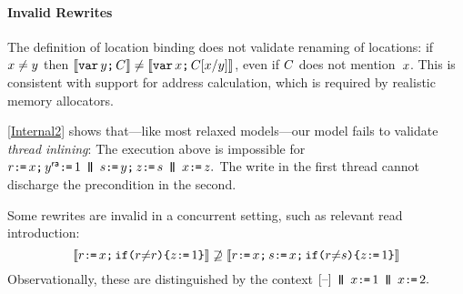 

\paragraph{Invalid Rewrites}

The definition of location binding does not validate renaming of locations:
if $x\neq y$ then
$\llbracket\texttt{var}\,y\texttt{;}\,\allowbreak C\rrbracket\neq\llbracket\texttt{var}\,x\texttt{;}\,\allowbreak C[x/y]\rrbracket$, even
if $C$ does not mention~$x$.  This is consistent with support for
address calculation, which is required by realistic memory allocators.

\ref{Internal2} shows that---like most relaxed models---our model
fails to validate \emph{thread inlining}: The execution above is impossible
for
\begin{math}
  \aReg\GETS x\SEMI
  y\REL\GETS 1\PAR
  \bReg\GETS y\SEMI
  z\GETS \bReg
  \PAR
  x\GETS z.
\end{math}
The write in the first thread cannot discharge the precondition in the
second.


Some rewrites are invalid in a concurrent setting, such as
relevant read introduction:
\begin{displaymath}
  \llbracket r \texttt{:}\mkern-1mu\texttt{=}\, x \texttt{;}\,\allowbreak \texttt{if}\allowbreak\texttt{(}r {\neq} r\texttt{)} \allowbreak\texttt{\{} z \texttt{:}\mkern-1mu\texttt{=}\, 1 \texttt{\}}\rrbracket
  \not\supseteq
  \llbracket r \texttt{:}\mkern-1mu\texttt{=}\, x \texttt{;}\,\allowbreak s \texttt{:}\mkern-1mu\texttt{=}\, x  \texttt{;}\,\allowbreak \texttt{if}\allowbreak\texttt{(}r {\neq}s\texttt{)} \allowbreak\texttt{\{} z \texttt{:}\mkern-1mu\texttt{=}\, 1 \texttt{\}}\rrbracket
\end{displaymath}
Observationally, these are distinguished by the context %
\begin{math}
  \hole{} \PAR x\GETS1\PAR x\GETS2.
\end{math}

